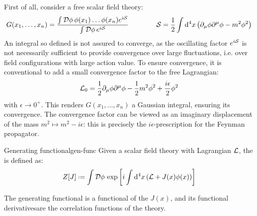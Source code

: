 First of all, consider a free scalar field theory:
\begin{equation*}
  G(x_1, \dots, x_n) = \frac{\int \mathcal{D}\phi\, \phi(x_1) \dots \phi(x_n) e^{i\mathcal{S}}}{\int \mathcal{D}\phi\, e^{i\mathcal{S}}}
  \qquad \qquad
  \mathcal{S} = \frac{1}{2} \int \mathrm{d}^4x \left( \partial_\mu \phi \partial^\mu \phi - m^2 \phi^2 \right)
\end{equation*}
An integral so defined is not assured to converge, as the oscillating factor $ e^{i\mathcal{S}} $ is not necessarily sufficient to provide convergence over large fluctuations, i.e. over field configurations with large action value. To ensure convergence, it is conventional to add a small convergence factor to the free Lagrangian:
\begin{equation}
  \mathcal{L}_0 = \frac{1}{2} \partial_\mu \phi \partial^\mu \phi - \frac{1}{2} m^2 \phi^2 + \frac{i \epsilon}{2} \phi^2
\end{equation}
with $ \epsilon \rightarrow 0^+ $. This renders $ G(x_1, \dots, x_n) $ a Gaussian integral, ensuring its convergence. The convergence factor can be viewed as an imaginary displacement of the mass $ m^2 \mapsto m^2 - i \epsilon $: this is precisely the $ i\epsilon $-prescription for the Feynman propagator.

\begin{definition}{Generating functional}{gen-func}
  Given a scalar field theory with Lagrangian $ \mathcal{L} $, the  is defined as:
  \begin{equation}
    Z[J] \defeq \int \mathcal{D}\phi\, \exp\left[ i \int \dd^4x \left( \lag + J(x) \phi(x) \right) \right]
  \end{equation}
\end{definition}

The generating functional is a functional of the  $ J(x) $, and its functional derivatives\footnotemark are the correlation functions of the theory.



